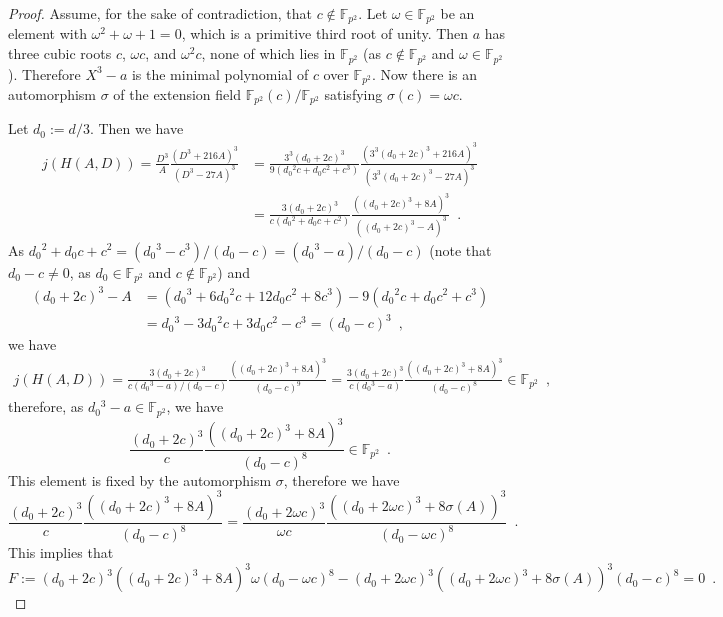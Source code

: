 \documentclass[10pt,a4paper]{amsart}
\newcommand{\FF}{\mathbb{F}}
\begin{document}
\begin{proof}
Assume, for the sake of contradiction, that $c \not\in \FF_{p^2}$.
Let $\omega \in \FF_{p^2}$ be an element with $\omega^2 + \omega + 1 = 0$, which is a primitive third root of unity.
Then $a$ has three cubic roots $c$, $\omega c$, and $\omega^2 c$, none of which lies in $\FF_{p^2}$ (as $c \not\in \FF_{p^2}$ and $\omega \in \FF_{p^2}$).
Therefore $X^3 - a$ is the minimal polynomial of $c$ over $\FF_{p^2}$.
Now there is an automorphism $\sigma$ of the extension field $\FF_{p^2}(c)/\FF_{p^2}$ satisfying $\sigma(c) = \omega c$.

Let $d_0 := d/3$.
Then we have
\[
\begin{split}
j(H(A,D))
= \frac{ D^3 }{ A } \frac{ (D^3 + 216A)^3 }{ (D^3 - 27A)^3 }
&= \frac{ 3^3 (d_0 + 2c)^3 }{ 9 (d_0{}^2 c + d_0 c^2 + c^3) } \frac{ ( 3^3 (d_0 + 2c)^3 + 216 A )^3 }{ ( 3^3 (d_0 + 2c)^3 - 27 A )^3 } \\
&= \frac{ 3 (d_0 + 2c)^3 }{ c (d_0{}^2 + d_0 c + c^2) } \frac{ ( (d_0 + 2c)^3 + 8 A )^3 }{ ( (d_0 + 2c)^3 - A )^3 } \enspace.
\end{split}
\]
As $d_0{}^2 + d_0 c + c^2 = (d_0{}^3 - c^3) / (d_0 - c) = (d_0{}^3 - a) / (d_0 - c)$ (note that $d_0 - c \neq 0$, as $d_0 \in \FF_{p^2}$ and $c \not\in \FF_{p^2}$) and
\[
\begin{split}
(d_0 + 2c)^3 - A
&= (d_0{}^3 + 6 d_0{}^2 c + 12 d_0 c^2 + 8 c^3) - 9 (d_0{}^2 c + d_0 c^2 + c^3) \\
&= d_0{}^3 - 3 d_0{}^2 c + 3 d_0 c^2 - c^3
= (d_0 - c)^3 \enspace,
\end{split}
\]
we have
\[
\begin{split}
j(H(A,D))
= \frac{ 3 (d_0 + 2c)^3 }{ c (d_0{}^3 - a) / (d_0 - c) } \frac{ ( (d_0 + 2c)^3 + 8 A )^3 }{ (d_0 - c)^9 }
= \frac{ 3 (d_0 + 2c)^3 }{ c (d_0{}^3 - a) } \frac{ ( (d_0 + 2c)^3 + 8 A )^3 }{ (d_0 - c)^8 }
\in \FF_{p^2} \enspace,
\end{split}
\]
therefore, as $d_0{}^3 - a \in \FF_{p^2}$, we have
\[
\frac{ (d_0 + 2c)^3 }{ c } \frac{ ( (d_0 + 2c)^3 + 8 A )^3 }{ (d_0 - c)^8 }
\in \FF_{p^2} \enspace.
\]
This element is fixed by the automorphism $\sigma$, therefore we have
\[
\frac{ (d_0 + 2c)^3 }{ c } \frac{ ( (d_0 + 2c)^3 + 8 A )^3 }{ (d_0 - c)^8 }
= \frac{ (d_0 + 2 \omega c)^3 }{ \omega c } \frac{ ( (d_0 + 2 \omega c)^3 + 8 \sigma(A) )^3 }{ (d_0 - \omega c)^8 } \enspace.
\]
This implies that
\[
F
:= (d_0 + 2c)^3 ( (d_0 + 2c)^3 + 8 A )^3 \omega (d_0 - \omega c)^8
- (d_0 + 2 \omega c)^3 ( (d_0 + 2 \omega c)^3 + 8 \sigma(A) )^3 (d_0 - c)^8
= 0 \enspace.
\]


\end{proof}
\end{document}
